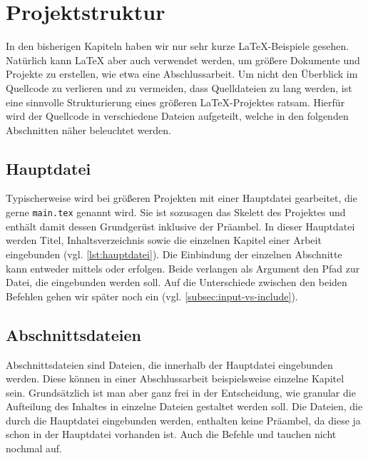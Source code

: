 \section{Projektstruktur}
\label{sec:projektstruktur}
In den bisherigen Kapiteln haben wir nur sehr kurze \LaTeX{}-Beispiele gesehen. Natürlich kann \LaTeX{} aber auch verwendet werden, um größere Dokumente und Projekte zu erstellen, wie etwa eine Abschlussarbeit. 
Um nicht den Überblick im Quellcode zu verlieren und zu vermeiden, dass Quelldateien zu lang werden, ist eine sinnvolle Strukturierung eines größeren \LaTeX{}-Projektes ratsam. Hierfür wird der Quellcode in verschiedene Dateien aufgeteilt, welche in den folgenden Abschnitten näher beleuchtet werden.

\subsection{Hauptdatei} Typischerweise wird bei größeren Projekten mit einer Hauptdatei gearbeitet, die gerne \texttt{main.tex} genannt wird. Sie ist sozusagen das Skelett des Projektes und enthält damit dessen Grundgerüst inklusive der Präambel. In dieser Hauptdatei werden Titel, Inhaltsverzeichnis sowie die einzelnen Kapitel einer Arbeit eingebunden (vgl. \cref{lst:hauptdatei}). Die Einbindung der einzelnen Abschnitte kann entweder mittels \texttt{} oder \texttt{} erfolgen. Beide verlangen als Argument den Pfad zur Datei, die eingebunden werden soll. Auf die Unterschiede zwischen den beiden Befehlen gehen wir später noch ein (vgl. \cref{subsec:input-vs-include}).
  
 
\subsection{Abschnittsdateien}
 Abschnittsdateien sind Dateien, die innerhalb der Hauptdatei eingebunden werden. Diese können in einer Abschlussarbeit beispielsweise einzelne Kapitel sein. Grundsätzlich ist man aber ganz frei in der Entscheidung, wie granular die Aufteilung des Inhaltes in einzelne Dateien gestaltet werden soll.
 Die Dateien, die durch die Hauptdatei eingebunden werden, enthalten keine Präambel, da diese ja schon in der Hauptdatei vorhanden ist. Auch die Befehle \texttt{} und \texttt{} tauchen nicht nochmal auf.
 
